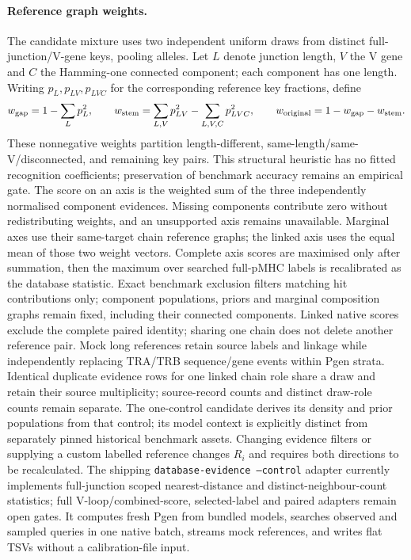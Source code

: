 \documentclass[10pt,a4paper]{article}
\theoremstyle{definition}
\newcommand{\code}[1]{\texttt{\small #1}}
\begin{document}
\paragraph{Reference graph weights.}
The candidate mixture uses two independent uniform draws from distinct full-junction/V-gene keys, pooling alleles.
Let $L$ denote junction length, $V$ the V gene and $C$ the Hamming-one connected component; each component has one length.
Writing $p_L,p_{LV},p_{LVC}$ for the corresponding reference key fractions, define
\[
 w_{\rm gap}=1-\sum_Lp_L^2,\qquad
 w_{\rm stem}=\sum_{L,V}p_{LV}^2-\sum_{L,V,C}p_{LVC}^2,\qquad
 w_{\rm original}=1-w_{\rm gap}-w_{\rm stem}.
\]
These nonnegative weights partition length-different, same-length/same-V/disconnected, and remaining key pairs.
This structural heuristic has no fitted recognition coefficients; preservation of benchmark accuracy remains an empirical gate.
The score on an axis is the weighted sum of the three independently normalised component evidences.
Missing components contribute zero without redistributing weights, and an unsupported axis remains unavailable.
Marginal axes use their same-target chain reference graphs; the linked axis uses the equal mean of those two weight vectors.
Complete axis scores are maximised only after summation, then the maximum over searched full-pMHC labels is recalibrated as the database statistic.
Exact benchmark exclusion filters matching hit contributions only; component populations, priors and marginal composition graphs remain fixed, including their connected components.
Linked native scores exclude the complete paired identity; sharing one chain does not delete another reference pair.
Mock long references retain source labels and linkage while independently replacing TRA/TRB sequence/gene events within Pgen strata.
Identical duplicate evidence rows for one linked chain role share a draw and retain their source multiplicity; source-record counts and distinct draw-role counts remain separate.
The one-control candidate derives its density and prior populations from that control; its model context is explicitly distinct from separately pinned historical benchmark assets.
Changing evidence filters or supplying a custom labelled reference changes $R_i$ and requires both directions to be recalculated.
The shipping \code{database-evidence --control} adapter currently implements full-junction scoped nearest-distance and distinct-neighbour-count statistics; full V-loop/combined-score, selected-label and paired adapters remain open gates.
It computes fresh Pgen from bundled models, searches observed and sampled queries in one native batch, streams mock references, and writes flat TSVs without a calibration-file input.
\end{document}
